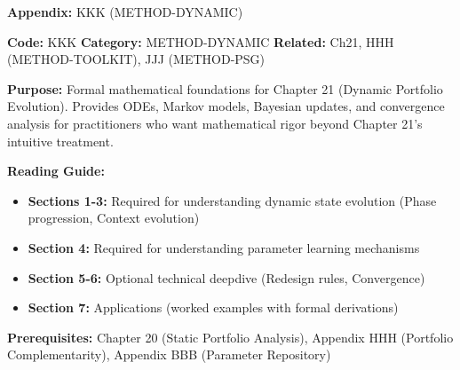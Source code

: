 \begin{tcolorbox}[colback=blue!5!white, colframe=blue!75!black, title=Quick Reference: Portfolio Evolution Dynamics]

\textbf{Appendix:} KKK (METHOD-DYNAMIC)

\textbf{Code:} KKK \quad \textbf{Category:} METHOD-DYNAMIC \quad \textbf{Related:} Ch21, HHH (METHOD-TOOLKIT), JJJ (METHOD-PSG)

\textbf{Purpose:} Formal mathematical foundations for Chapter 21 (Dynamic Portfolio Evolution). Provides ODEs, Markov models, Bayesian updates, and convergence analysis for practitioners who want mathematical rigor beyond Chapter 21's intuitive treatment.

\textbf{Reading Guide:}
\begin{itemize}[nosep]
\item \textbf{Sections 1-3:} Required for understanding dynamic state evolution (Phase progression, Context evolution)
\item \textbf{Section 4:} Required for understanding parameter learning mechanisms
\item \textbf{Section 5-6:} Optional technical deepdive (Redesign rules, Convergence)
\item \textbf{Section 7:} Applications (worked examples with formal derivations)
\end{itemize}

\textbf{Prerequisites:} Chapter 20 (Static Portfolio Analysis), Appendix HHH (Portfolio Complementarity), Appendix BBB (Parameter Repository)

\end{tcolorbox}


